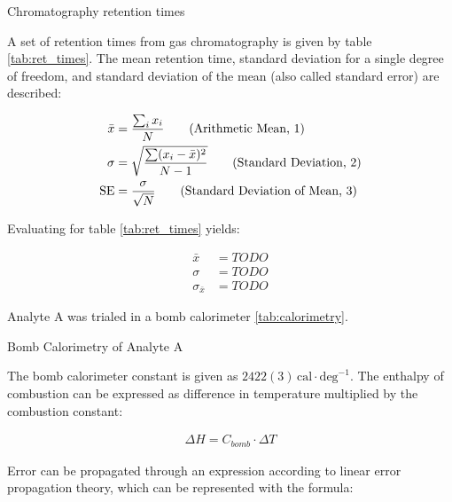 
\begin{table}
    \centering
    \caption{Chromatography retention times}
    \label{tab:ret_times}
\end{table}

A set of retention times from gas chromatography is given by table \ref{tab:ret_times}. 
The mean retention time, standard deviation for a single degree of freedom, and standard deviation of the mean (also called standard error) are described:

\begin{align}
    \bar{x} & = \frac{\sum_i x_i}{N} \stepcounter{equation} \tag{\text{Arithmetic Mean, 1}} \\
    \sigma & = \sqrt \frac{\sum (x_i-\bar{x})^2}{N-1}
    \stepcounter{equation} \tag{\text{Standard Deviation, 2}} \\
    \text{SE} & = \frac{\sigma}{\sqrt{N}}
    \stepcounter{equation} \tag{\text{Standard Deviation of Mean, 3}}
\end{align}

Evaluating for table \ref{tab:ret_times} yields:

\begin{align}
    \bar{x} & = TODO \\
    \sigma & = TODO \\
    \sigma_{\bar{x}} & = TODO
\end{align}


Analyte A was trialed in a bomb calorimeter \ref{tab:calorimetry}.  

\begin{table}
    \centering
    \caption{Bomb Calorimetry of Analyte A}
    \label{tab:calorimetry}
\end{table}

The bomb calorimeter constant is given as $2422(3) \, \mathrm{cal} \cdot \mathrm{deg}^{-1}$.  The enthalpy of combustion can be expressed as difference in temperature multiplied by the combustion constant:

\begin{align}
    \Delta H = C_{bomb} \cdot \Delta T
    \label{bomb_energy}
\end{align}

Error can be propagated through an expression according to linear error propagation theory, which can be represented with the formula:

